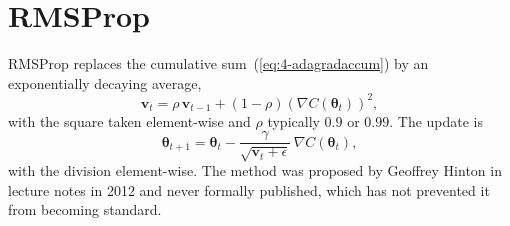 \section{RMSProp}
\label{sec:rmsprop}

RMSProp replaces the cumulative sum~(\ref{eq:4-adagradaccum}) by an
exponentially decaying average,
\begin{equation}
  \bm{v}_t = \rho\,\bm{v}_{t-1} + (1-\rho)\left(\nabla C(\bm{\theta}_t)\right)^{2},
  \label{eq:4-rmspropaccum}
\end{equation}
with the square taken element-wise and $\rho$ typically $0.9$ or $0.99$.  The
update is
\begin{equation}
  \boxed{\;
  \bm{\theta}_{t+1} = \bm{\theta}_t
    - \frac{\gamma}{\sqrt{\bm{v}_t+\epsilon}}\,\nabla C(\bm{\theta}_t) , \;}
  \label{eq:4-rmsprop}
\end{equation}
with the division element-wise.  The method was proposed by Geoffrey Hinton in
lecture notes in 2012 and never formally published, which has not prevented it
from becoming standard.

